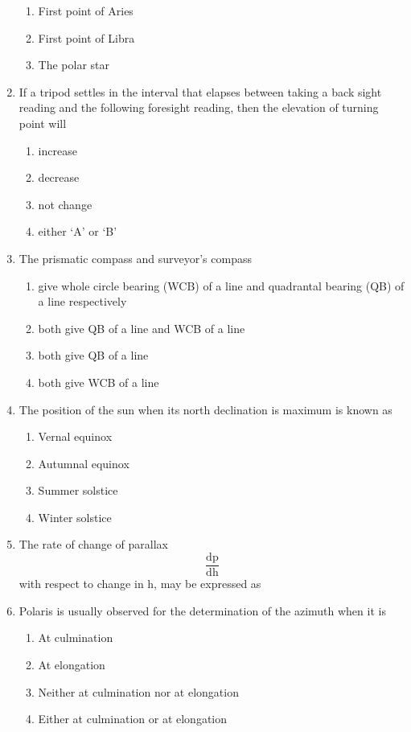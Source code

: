 \documentclass[11pt,a4paper]{article}
\begin{document}
\begin{enumerate}
\begin{enumerate}[label=\Alph*.]
\item{First point of Aries}
\item{First point of Libra}
\item{The polar star}
\end{enumerate}
\item{If a tripod settles in the interval that elapses between taking a back sight reading and the following foresight reading, then the elevation of turning point will}
\begin{enumerate}[label=\Alph*.]
\item{increase}
\item{decrease}
\item{not change}
\item{either `A' or `B'}
\end{enumerate}
\item{The prismatic compass and surveyor's compass
}
\begin{enumerate}[label=\Alph*.]
\item{give whole circle bearing (WCB) of a line and quadrantal bearing (QB) of a line respectively}
\item{both give QB of a line and WCB of a line}
\item{both give QB of a line}
\item{both give WCB of a line}
\end{enumerate}
\item{The position of the sun when its north declination is maximum is known as}
\begin{enumerate}[label=\Alph*.]
\item{Vernal equinox}
\item{Autumnal equinox}
\item{Summer solstice}
\item{Winter solstice}
\end{enumerate}
\item{The rate of change of parallax $$\frac{{{\text{dp}}}}{{{\text{dh}}}}$$ with respect to change in h, may be expressed as}
\\
\item{Polaris is usually observed for the determination of the azimuth when it is}
\begin{enumerate}[label=\Alph*.]
\item{At culmination}
\item{At elongation}
\item{Neither at culmination nor at elongation}
\item{Either at culmination or at elongation}
\end{enumerate}
\end{enumerate}
\end{document}
